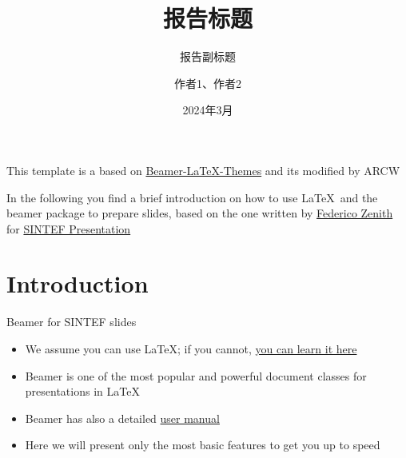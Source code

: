 \documentclass{beamer}
\title{报告标题}
\subtitle{报告副标题}
\author{作者1、作者2}
\date{2024年3月}
\newcommand{\hrefcol}[2]{\textcolor{cyan}{\href{#1}{#2}}}
\begin{document}
\maketitle

\begin{frame}

This template is a based on \hrefcol{https://github.com/TOB-KNPOB/Beamer-LaTeX-Themes}{Beamer-LaTeX-Themes} and its modified by ARCW

\vspace{\baselineskip}

In the following you find a brief introduction on how to use \LaTeX\ and the beamer package to prepare slides, based on the one written by \hrefcol{mailto:federico.zenith@sintef.no}{Federico Zenith} for \hrefcol{https://www.overleaf.com/latex/templates/sintef-presentation/jhbhdffczpnx}{SINTEF Presentation}


\end{frame}

\section{Introduction}

\begin{frame}{Beamer for SINTEF slides}
\begin{itemize}
\item We assume you can use \LaTeX; if you cannot,
\hrefcol{http://en.wikibooks.org/wiki/LaTeX/}{you can learn it here}
\item Beamer is one of the most popular and powerful document
classes for presentations in \LaTeX
\item Beamer has also a detailed
\hrefcol{http://www.ctan.org/tex-archive/macros/latex/contrib/beamer/doc/beameruserguide.pdf}{user
 manual}
\item Here we will present only the most basic features to get you up to speed
\end{itemize}
\end{frame}
\end{document}
